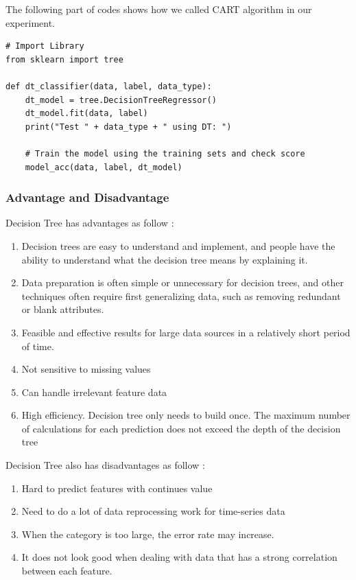 \documentclass[sigconf]{acmart}
\begin{document}
The following part of codes shows how we called CART algorithm in our experiment.
\begin{lstlisting}
# Import Library
from sklearn import tree

def dt_classifier(data, label, data_type):
    dt_model = tree.DecisionTreeRegressor()
    dt_model.fit(data, label)
    print("Test " + data_type + " using DT: ")
    
    # Train the model using the training sets and check score
    model_acc(data, label, dt_model)
\end{lstlisting}

\subsubsection{Advantage and Disadvantage}

Decision Tree has advantages as follow \cite{DT}:
\begin{enumerate}
    \item Decision trees are easy to understand and implement, and people have the ability to understand what the decision tree means by explaining it.
    \item Data preparation is often simple or unnecessary for decision trees, and other techniques often require first generalizing data, such as removing redundant or blank attributes.
    \item Feasible and effective results for large data sources in a relatively short period of time.
    \item Not sensitive to missing values
    \item Can handle irrelevant feature data
    \item High efficiency. Decision tree only needs to build once. The maximum number of calculations for each prediction does not exceed the depth of the decision tree
\end{enumerate}

Decision Tree also has disadvantages as follow \cite{DT}:
\begin{enumerate}
    \item Hard to predict features with continues value
    \item Need to do a lot of data reprocessing work for time-series data
    \item When the category is too large, the error rate may increase.
    \item It does not look good when dealing with data that has a strong correlation between each feature.
\end{enumerate}
\end{document}
